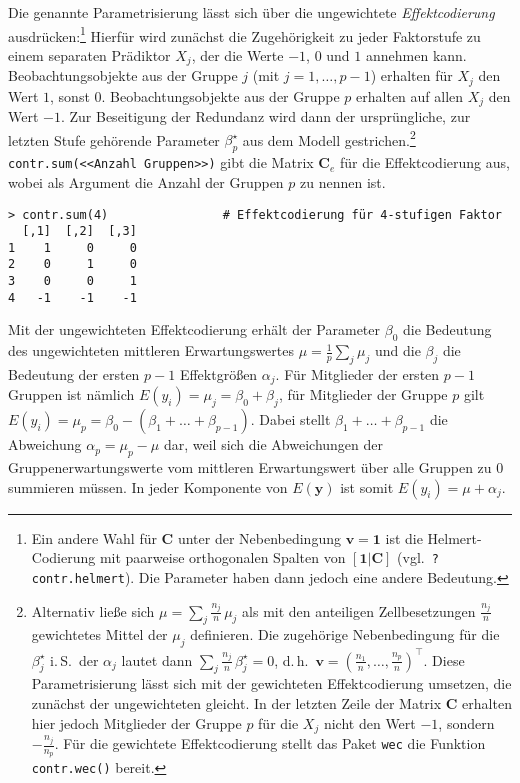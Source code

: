 Die genannte Parametrisierung lässt sich über die ungewichtete \emph{Effektcodierung} ausdrücken:\footnote{Ein andere Wahl für $\bm{C}$ unter der Nebenbedingung $\bm{v} = \bm{1}$ ist die Helmert-Codierung mit paarweise orthogonalen Spalten von $[\bm{1} | \bm{C}]$ (vgl.\ \lstinline!?contr.helmert!). Die Parameter haben dann jedoch eine andere Bedeutung.} Hierfür wird zunächst die Zugehörigkeit zu jeder Faktorstufe zu einem separaten Prädiktor $X_{j}$, der die Werte $-1$, $0$ und $1$ annehmen kann. Beobachtungsobjekte aus der Gruppe $j$ (mit $j = 1, \ldots, p-1$) erhalten für $X_{j}$ den Wert $1$, sonst $0$. Beobachtungsobjekte aus der Gruppe $p$ erhalten auf allen $X_{j}$ den Wert $-1$. Zur Beseitigung der Redundanz wird dann der ursprüngliche, zur letzten Stufe gehörende Parameter $\beta_{p}^{\star}$ aus dem Modell gestrichen.\footnote{\label{ftn:effCodeWght}Alternativ ließe sich $\mu = \sum_{j} \frac{n_{j}}{n} \, \mu_{j}$ als mit den anteiligen Zellbesetzungen $\frac{n_{j}}{n}$ gewichtetes Mittel der $\mu_{j}$ definieren. Die zugehörige Nebenbedingung für die $\beta_{j}^{\star}$ i.\,S.\ der $\alpha_{j}$ lautet dann $\sum_{j}\frac{n_{j}}{n} \, \beta_{j}^{\star} = 0$, d.\,h.\ $\bm{v} = (\frac{n_{1}}{n}, \ldots, \frac{n_{p}}{n})^{\top}$. Diese Parametrisierung lässt sich mit der gewichteten Effektcodierung umsetzen, die zunächst der ungewichteten gleicht. In der letzten Zeile der Matrix $\bm{C}$ erhalten hier jedoch Mitglieder der Gruppe $p$ für die $X_{j}$ nicht den Wert $-1$, sondern $-\frac{n_{j}}{n_{p}}$. Für die gewichtete Effektcodierung stellt das Paket  \lstinline!wec! \cite{Nieuwenhuis2017} die Funktion \lstinline!contr.wec()! bereit.} \lstinline!contr.sum(<<Anzahl Gruppen>>)! gibt die Matrix $\bm{C}_{e}$ für die Effektcodierung aus, wobei als Argument die Anzahl der Gruppen $p$ zu nennen ist.
\begin{lstlisting}
> contr.sum(4)                # Effektcodierung für 4-stufigen Faktor
  [,1]  [,2]  [,3]
1    1     0     0
2    0     1     0
3    0     0     1
4   -1    -1    -1
\end{lstlisting}

Mit der ungewichteten Effektcodierung erhält der Parameter $\beta_{0}$ die Bedeutung des ungewichteten mittleren Erwartungswertes $\mu = \frac{1}{p} \sum_{j} \mu_{j}$ und die $\beta_{j}$ die Bedeutung der ersten $p-1$ Effektgrößen $\alpha_{j}$. Für Mitglieder der ersten $p-1$ Gruppen ist nämlich $E(y_{i}) = \mu_{j} = \beta_{0} + \beta_{j}$, für Mitglieder der Gruppe $p$ gilt $E(y_{i}) = \mu_{p} = \beta_{0} - (\beta_{1} + {\dots} + \beta_{p-1})$. Dabei stellt $\beta_{1} + {\dots} + \beta_{p-1}$ die Abweichung $\alpha_{p} = \mu_{p} - \mu$ dar, weil sich die Abweichungen der Gruppenerwartungswerte vom mittleren Erwartungswert über alle Gruppen zu $0$ summieren müssen. In jeder Komponente von $E(\bm{y})$ ist somit $E(y_{i}) = \mu + \alpha_{j}$.

